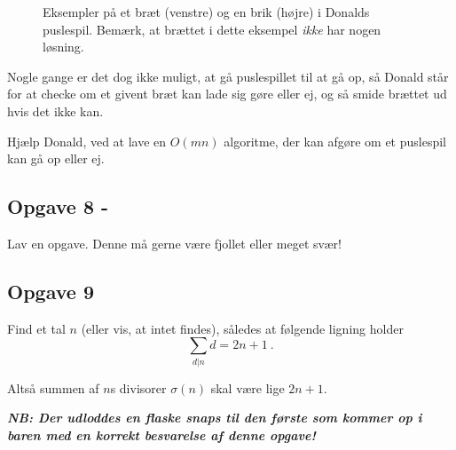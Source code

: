 \begin{figure}[htbp]
\begin{minipage}[h]{0.2\linewidth}
    \end{minipage}
    \vspace*{15pt}
    \caption{Eksempler på et bræt (venstre) og en brik (højre) i Donalds
        puslespil. Bemærk, at brættet i dette eksempel \emph{ikke} har nogen
        løsning.}
\end{figure}

Nogle gange er det dog ikke muligt, at gå puslespillet til at gå op, så
Donald står for at checke om et givent bræt kan lade sig gøre eller ej, og
så smide brættet ud hvis det ikke kan.

Hjælp Donald, ved at lave en $O(mn)$ algoritme, der kan afgøre om et puslespil
kan gå op eller ej.



\subsection{Opgave 8 - \color{red}{TODO!}}
Lav en opgave. Denne må gerne være fjollet eller meget svær!


\subsection{Opgave 9}

Find et tal $n$ (eller vis, at intet findes), således at følgende ligning
holder
\[
    \sum_{d|n} d = 2n + 1\ .
\]

Altså summen af $n$s divisorer $\sigma(n)$ skal være lige $2n+1$.


\textbf{\emph{NB: Der udloddes en flaske snaps til den første som kommer op i baren med en korrekt besvarelse af denne opgave!}}

